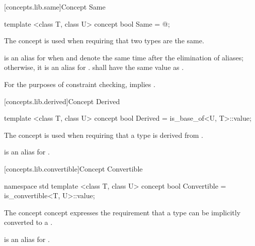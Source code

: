 \begin{addedblock}
\pnum
{}

[concepts.lib.same]{Concept Same}

%
\begin{itemdecl}
template <class T, class U>
concept bool Same = @\impdef@;
\end{itemdecl}

\begin{itemdescr}
\pnum
The  concept is used when requiring that two types are the same.

\pnum
{} is an alias for  when  and 
denote the same time after the elimination of aliases; otherwise, it is an alias for
.  shall have the same value as
.

\pnum
\remarks For the purposes of constraint checking,  implies
.
\end{itemdescr}

[concepts.lib.derived]{Concept Derived}

%
\begin{itemdecl}
template <class T, class U>
concept bool Derived = is_base_of<U, T>::value;
\end{itemdecl}

\begin{itemdescr}
\pnum
The  concept is used when requiring that a type  is derived
from .

\pnum
{} is an alias for .
\end{itemdescr}

[concepts.lib.convertible]{Concept Convertible}

%
\begin{itemdecl}
namespace std {
  template <class T, class U>
  concept bool Convertible = is_convertible<T, U>::value;
}
\end{itemdecl}

\begin{itemdescr}
\pnum
The  concept concept expresses the requirement that a type
 can be implicitly converted to a .

\pnum
{} is an alias for .
\end{itemdescr}


\end{addedblock}
